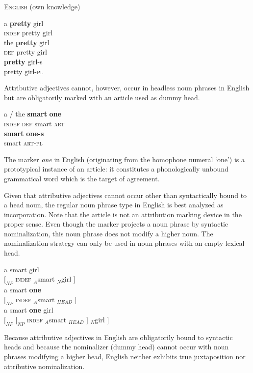 \begin{exe}
\ex \textsc{English} (own knowledge)
\begin{xlist}
\ex 
\gll	a \textbf{pretty} girl\\
	\textsc{indef} pretty girl\\
\ex
\gll	the \textbf{pretty} girl\\
	\textsc{def} pretty girl\\
\ex 
\gll	\textbf{pretty} girl-s\\
	pretty girl-\textsc{pl}\\
\end{xlist}
\end{exe}
Attributive adjectives cannot, however, occur in headless noun phrases in English but are obligatorily marked with an article used as dummy head.
\begin{exe}
\ex
\begin{xlist}
\ex
\gll	a / the \textbf{smart} \textbf{one}\\
	\textsc{indef} {} \textsc{def} smart \textsc{art}\\
\ex	
\gll	\textbf{smart} \textbf{one-s}\\
	smart \textsc{art}-\textsc{pl}\\
\end{xlist}
\end{exe}
The marker \textit{one} in English (originating from the homophone numeral ‘one’) is a prototypical instance of an article: it constitutes a phonologically unbound grammatical word which is the target of agreement. 

Given that attributive adjectives cannot occur other than syntactically bound to a head noun, the regular noun phrase type in English is best analyzed as incorporation. Note that the article is not an attribution marking device in the proper sense. Even though the marker projects a noun phrase by syntactic nominalization, this noun phrase does not modify a higher noun. The nominalization strategy can only be used in noun phrases with an empty lexical head.
\begin{exe}
\ex
\begin{xlist}
\ex
\gll	{} a smart girl\\
	$[_{NP}$ \textsc{indef} $_{A}$smart $_{N}$girl $]$\\
\ex
\gll	{} a smart \textbf{one}\\
	$[_{NP}$ \textsc{indef} $_{A}$smart $_{HEAD}$ $]$\\
\ex
\gll	{*} {} {} a smart \textbf{one} {} girl\\
	{} $[_{NP}$  $[_{NP}$ \textsc{indef} $_{A}$smart $_{HEAD}$ $]$ $_{N}$girl $]$\\
\end{xlist}
\end{exe}
Because attributive adjectives in English are obligatorily bound to syntactic heads and because the nominalizer (dummy head) cannot occur with noun phrases modifying a higher head, English neither exhibits true juxtaposition nor attributive nominalization.

